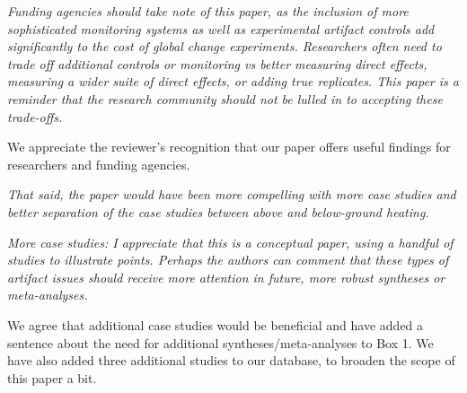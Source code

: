 \documentclass[11pt,a4paper]{letter}
\begin{document}
\begin{letter}{}
\par \emph{Funding agencies should take note of this paper, as the inclusion of more sophisticated monitoring systems as well as experimental artifact controls add significantly to the cost of global change experiments.  Researchers often need to trade off additional controls or monitoring vs better measuring direct effects, measuring a wider suite of direct effects, or adding true replicates.  This paper is a reminder that the research community should not be lulled in to accepting these trade-offs.}

\par We appreciate the reviewer's recognition that our paper offers useful findings for researchers and funding agencies. 

\par \emph{That said, the paper would have been more compelling with more case studies and better separation of the case studies between above and below-ground heating.}

\par \emph{More case studies:  I appreciate that this is a conceptual paper, using a handful of studies to illustrate points.  Perhaps the authors can comment that these types of artifact issues should receive more attention in future, more robust syntheses or meta-analyses.}
\par We agree that additional case studies would be beneficial and have added a sentence about the need for additional syntheses/meta-analyses to Box 1. We have also added three additional studies to our database, to broaden the scope of this paper a bit.  


\end{letter}
\end{document}
